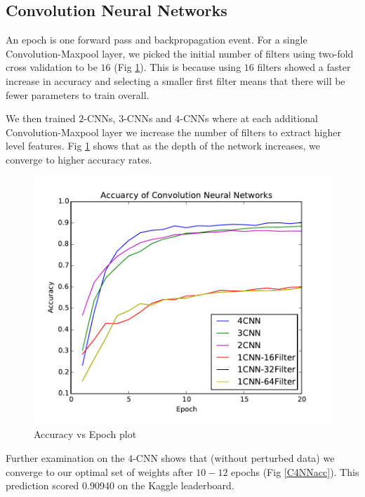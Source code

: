 \documentclass[conference]{IEEEtran}
\begin{document}


\subsection{Convolution Neural Networks}
An epoch is one forward pass and backpropagation event. For a single Convolution-Maxpool layer, we picked the initial number of filters using two-fold cross validation to be $16$ (Fig \ref{CNNacc}). This is because using $16$ filters showed a faster increase in accuracy and selecting a smaller first filter means that there will be fewer parameters to train overall.

We then trained $2$-CNNs, $3$-CNNs and $4$-CNNs where at each additional Convolution-Maxpool layer we increase the number of filters to extract higher level features. Fig \ref{CNNacc} shows that as the depth of the network increases, we converge to higher accuracy rates.

\begin{figure}[h]
	\centering
	\includegraphics[scale=0.45]{CNNacc.pdf}
	\caption{Accuracy vs Epoch plot}
		\label{CNNacc}
\end{figure}

Further examination on the $4$-CNN shows that (without perturbed data) we converge to our optimal set of weights after $10-12$ epochs (Fig \ref{C4NNacc}). This prediction scored 0.90940 on the Kaggle leaderboard.
\end{document}
